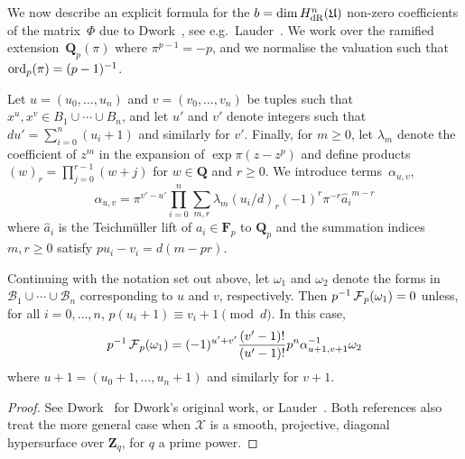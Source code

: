 We now describe an explicit formula for the $b = \dim H_{\text{dR}}^n(\mathfrak{U})$ 
non-zero coefficients of the matrix~$\Phi$ due to Dwork~\citep{Dwork64}, see 
e.g.\ Lauder~\citep[\S 6.1]{Lau04}.   We work over the ramified 
extension~$\mathbf{Q}_p(\pi)$ where $\pi^{p-1} = -p$, and we normalise 
the valuation such that \mbox{$\operatorname{ord}_p(\pi) = (p-1)^{-1}$}.

Let $u = (u_0, \dotsc, u_n)$ and $v = (v_0, \dotsc, v_n)$ be tuples such 
that $x^u, x^v \in B_1 \cup \dotsb \cup B_n$,  and let $u'$ and $v'$ 
denote integers such that $d u' = \sum_{i=0}^n (u_i + 1)$ and similarly 
for $v'$.  Finally, for $m \geq 0$, let $\lambda_m$ denote the coefficient 
of $z^m$ in the expansion of $\exp \pi (z - z^p)$ and define products 
$(w)_r = \prod_{j=0}^{r-1} (w + j)$ for $w \in \mathbf{Q}$ and $r \geq 0$. 
We introduce terms~$\alpha_{u,v}$, 
\begin{equation} \label{eq:alpha}
\alpha_{u,v} = \pi^{v' - u'} \prod_{i = 0}^n \sum_{m, r} \lambda_m (u_i / d)_r (-1)^r \pi^{-r} {\hat{a}_i}^{m-r}
\end{equation}
where $\hat{a}_i$ is the Teichm\"uller lift of $a_i \in \mathbf{F}_p$ 
to $\mathbf{Q}_p$ and the summation indices $m, r \geq 0$ satisfy 
$p u_i - v_i = d (m - pr)$.

\begin{thm} \label{thm:01-03-diagfrob}
Continuing with the notation set out above, let $\omega_1$ and $\omega_2$ 
denote the forms in $\mathcal{B}_1 \cup \dotsb \cup \mathcal{B}_n$ 
corresponding to $u$ and $v$, respectively.  
Then $p^{-1} \operatorname{\mathcal{F}}_p (\omega_1) = 0$ unless, for all $i = 0, \dotsc, n$, 
$p (u_i + 1) \equiv v_i + 1 \pmod{d}$.  In this case, 
\begin{equation*}
p^{-1} \operatorname{\mathcal{F}}_p (\omega_1) = 
    (-1)^{u' + v'} \frac{(v' - 1)!}{(u' - 1)!} p^n \alpha_{u+1,v+1}^{-1} \omega_2
\end{equation*}
where $u + 1 = (u_0 + 1, \dotsc, u_n + 1)$ and similarly for $v + 1$.
\end{thm}

\begin{proof}
See Dwork~\citep[\S 4]{Dwork64} for Dwork's original work, or 
Lauder~\citep[\S 6.1]{Lau04}.  Both references also treat the 
more general case when $\mathcal{X}$ is a smooth, projective, 
diagonal hypersurface over $\mathbf{Z}_q$, for $q$ a prime power.
\end{proof}


